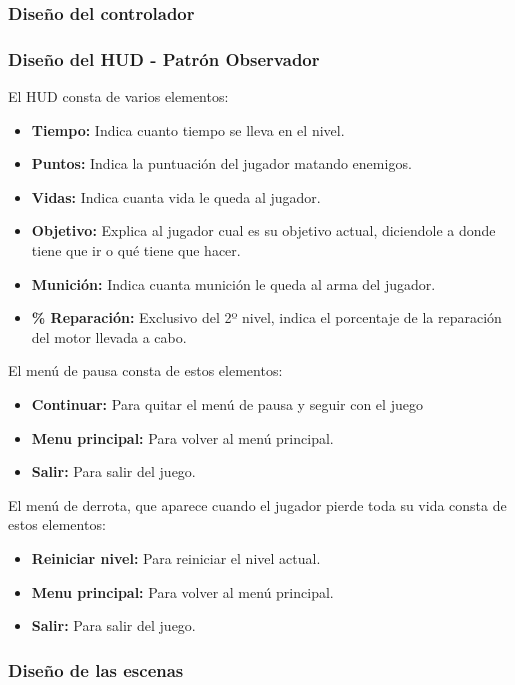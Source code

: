\subsubsection{Diseño del controlador}

\subsubsection{Diseño del HUD - Patrón Observador}
El HUD consta de varios elementos:
\begin{itemize}
	\item \textbf{Tiempo:} Indica cuanto tiempo se lleva en el nivel.
	\item \textbf{Puntos:} Indica la puntuación del jugador matando enemigos.
	\item \textbf{Vidas:} Indica cuanta vida le queda al jugador.
	\item \textbf{Objetivo:} Explica al jugador cual es su objetivo actual, diciendole a donde tiene que ir o qué tiene que hacer.
	\item \textbf{Munición:} Indica cuanta munición le queda al arma del jugador.
	\item \textbf{\% Reparación:} Exclusivo del 2º nivel, indica el porcentaje de la reparación del motor llevada a cabo.
\end{itemize}
El menú de pausa consta de estos elementos:
\begin{itemize}
	\item \textbf{Continuar:} Para quitar el menú de pausa y seguir con el juego
	\item \textbf{Menu principal:} Para volver al menú principal.
	\item \textbf{Salir:} Para salir del juego.
\end{itemize}
El menú de derrota, que aparece cuando el jugador pierde toda su vida consta de estos elementos:
\begin{itemize}
	\item \textbf{Reiniciar nivel:} Para reiniciar el nivel actual.
	\item \textbf{Menu principal:} Para volver al menú principal.
	\item \textbf{Salir:} Para salir del juego.
\end{itemize}

\subsubsection{Diseño de las escenas}

